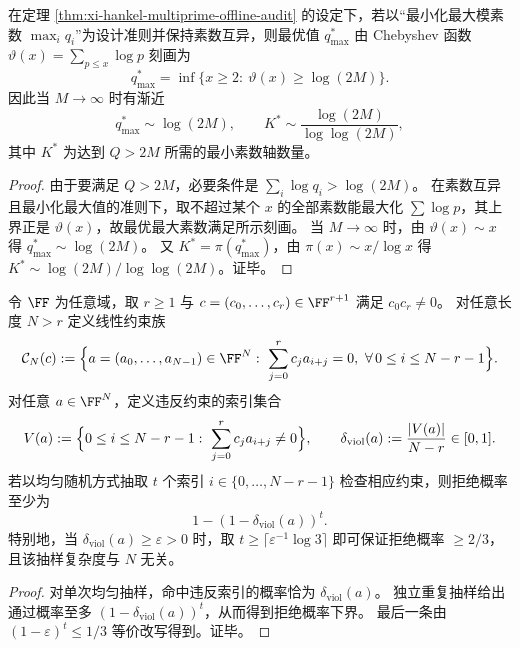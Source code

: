 \begin{corollary}[最大模素数受限时的最优对数尺度]\label{cor:xi-hankel-offline-audit-max-prime-logscale}
在定理 \ref{thm:xi-hankel-multiprime-offline-audit} 的设定下，若以“最小化最大模素数 \(\max_i q_i\)”为设计准则并保持素数互异，则最优值 \(q_{\max}^\ast\) 由 Chebyshev 函数
\(
\vartheta(x)=\sum_{p\le x}\log p
\)
刻画为
\[
q_{\max}^\ast=\inf\{x\ge 2:\ \vartheta(x)\ge \log(2M)\}.
\]
因此当 \(M\to\infty\) 时有渐近
\[
q_{\max}^\ast\sim \log(2M),
\qquad
K^\ast\sim \frac{\log(2M)}{\log\log(2M)},
\]
其中 \(K^\ast\) 为达到 \(Q>2M\) 所需的最小素数轴数量。
\end{corollary}
\begin{proof}
由于要满足 \(Q>2M\)，必要条件是 \(\sum_i\log q_i>\log(2M)\)。
在素数互异且最小化最大值的准则下，取不超过某个 \(x\) 的全部素数能最大化 \(\sum\log p\)，其上界正是 \(\vartheta(x)\)，故最优最大素数满足所示刻画。
当 \(M\to\infty\) 时，由 \(\vartheta(x)\sim x\) 得 \(q_{\max}^\ast\sim \log(2M)\)。
又 \(K^\ast=\pi(q_{\max}^\ast)\)，由 \(\pi(x)\sim x/\log x\) 得 \(K^\ast\sim \log(2M)/\log\log(2M)\)。证毕。
\end{proof}





\begin{proposition}\label{prop:xi-linear-recurrence-local-test-by-violation-rate}
令 \(\FF\) 为任意域，取 \(r\ge 1\) 与 \(c=(c_0,\dots,c_r)\in\FF^{r+1}\) 满足 \(c_0c_r\neq 0\)。
对任意长度 \(N>r\) 定义线性约束族
\[
\mathcal C_N(c):=\Bigl\{a=(a_0,\dots,a_{N-1})\in\FF^N:\ \sum_{j=0}^r c_j a_{i+j}=0,\ \forall\,0\le i\le N-r-1\Bigr\}.
\]
对任意 \(a\in\FF^N\)，定义违反约束的索引集合
\[
V(a):=\Bigl\{0\le i\le N-r-1:\ \sum_{j=0}^r c_j a_{i+j}\ne 0\Bigr\},
\qquad
\delta_{\mathrm{viol}}(a):=\frac{|V(a)|}{N-r}\in[0,1].
\]
若以均匀随机方式抽取 \(t\) 个索引 \(i\in\{0,\dots,N-r-1\}\) 检查相应约束，则拒绝概率至少为
\[
1-(1-\delta_{\mathrm{viol}}(a))^t.
\]
特别地，当 \(\delta_{\mathrm{viol}}(a)\ge\varepsilon>0\) 时，取
\(
t\ge \lceil \varepsilon^{-1}\log 3\rceil
\)
即可保证拒绝概率 \(\ge 2/3\)，且该抽样复杂度与 \(N\) 无关。
\end{proposition}
\begin{proof}
对单次均匀抽样，命中违反索引的概率恰为 \(\delta_{\mathrm{viol}}(a)\)。
独立重复抽样给出通过概率至多 \((1-\delta_{\mathrm{viol}}(a))^t\)，从而得到拒绝概率下界。
最后一条由 \((1-\varepsilon)^t\le 1/3\) 等价改写得到。证毕。
\end{proof}

